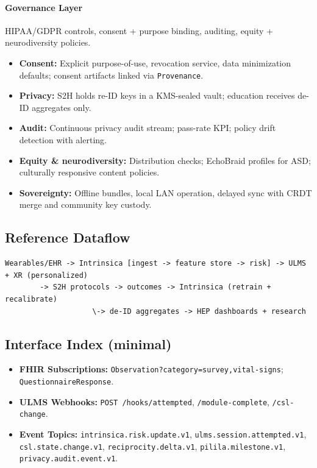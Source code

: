 \documentclass[11pt]{article}
\theoremstyle{plain}
\begin{document}
\paragraph{Governance Layer}
HIPAA/GDPR controls, consent + purpose binding, auditing, equity + neurodiversity policies.
\begin{itemize}
  \item \textbf{Consent:} Explicit purpose-of-use, revocation service, data minimization defaults; consent artifacts linked via \texttt{Provenance}.
  \item \textbf{Privacy:} S2H holds re-ID keys in a KMS-sealed vault; education receives de-ID aggregates only.
  \item \textbf{Audit:} Continuous privacy audit stream; pass-rate KPI; policy drift detection with alerting.
  \item \textbf{Equity \& neurodiversity:} Distribution checks; EchoBraid profiles for ASD; culturally responsive content policies.
  \item \textbf{Sovereignty:} Offline bundles, local LAN operation, delayed sync with CRDT merge and community key custody.
\end{itemize}

\subsection{Reference Dataflow}
\begin{verbatim}
Wearables/EHR -> Intrinsica [ingest -> feature store -> risk] -> ULMS + XR (personalized)
        -> S2H protocols -> outcomes -> Intrinsica (retrain + recalibrate)
                    \-> de-ID aggregates -> HEP dashboards + research
\end{verbatim}

\subsection{Interface Index (minimal)}
\begin{itemize}
  \item \textbf{FHIR Subscriptions:} \texttt{Observation?category=survey,vital-signs}; \texttt{QuestionnaireResponse}.
  \item \textbf{ULMS Webhooks:} \texttt{POST /hooks/attempted}, \texttt{/module-complete}, \texttt{/csl-change}.
  \item \textbf{Event Topics:} \texttt{intrinsica.risk.update.v1}, \texttt{ulms.session.attempted.v1}, \texttt{csl.state.change.v1},
  \texttt{reciprocity.delta.v1}, \texttt{pilila.milestone.v1}, \texttt{privacy.audit.event.v1}.
\end{itemize}
\end{document}
